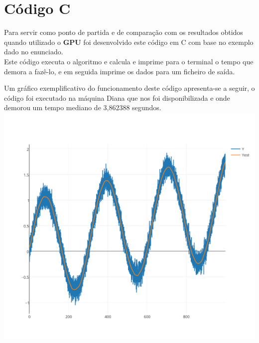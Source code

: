 \chapter{Código C}
Para servir como ponto de partida e de comparação com os resultados obtidos quando utilizado o \textbf{GPU} foi desenvolvido este código em C com base no exemplo dado no enunciado.\\



Este código executa o algoritmo e calcula e imprime para o terminal o tempo que demora a fazê-lo, e em seguida imprime os dados para um ficheiro de saída.

Um gráfico exemplificativo do funcionamento deste código apresenta-se a seguir, o código foi executado na máquina Diana que nos foi disponibilizada e onde demorou um tempo mediano de 3,862388
segundos.\\

\includegraphics[width=\textwidth]{output}